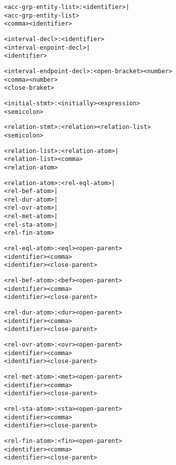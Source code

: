 \documentclass[11pt]{report}
\newenvironment{vverbatim}
{
  \begin{alltt}
}
{
    \vspace{-\baselineskip}
  \end{alltt}
}
\begin{document}
\begin{vverbatim}
<acc-grp-entity-list>    : <identifier> |
                           <acc-grp-entity-list>
                           <comma> <identifier>

<interval-decl>          : <identifier>
                           <interval-enpoint-decl> |
                           <identifier>

<interval-endpoint-decl> : <open-bracket> <number>
                           <comma> <number>
                           <close-braket>

<initial-stmt>           : <initially> <expression>
                           <semicolon>

<relation-stmt>          : <relation> <relation-list>
                           <semicolon>

<relation-list>          : <relation-atom> |
                           <relation-list> <comma>
                           <relation-atom>

<relation-atom>          : <rel-eql-atom> |
                           <rel-bef-atom> |
                           <rel-dur-atom> |
                           <rel-ovr-atom> |
                           <rel-met-atom> |
                           <rel-sta-atom> |
                           <rel-fin-atom>

<rel-eql-atom>           : <eql> <open-parent>
                           <identifier> <comma>
                           <identifier> <close-parent>

<rel-bef-atom>           : <bef> <open-parent>
                           <identifier> <comma>
                           <identifier> <close-parent>

<rel-dur-atom>           : <dur> <open-parent>
                           <identifier> <comma>
                           <identifier> <close-parent>

<rel-ovr-atom>           : <ovr> <open-parent>
                           <identifier> <comma>
                           <identifier> <close-parent>

<rel-met-atom>           : <met> <open-parent>
                           <identifier> <comma>
                           <identifier> <close-parent>

<rel-sta-atom>           : <sta> <open-parent>
                           <identifier> <comma>
                           <identifier> <close-parent>

<rel-fin-atom>           : <fin> <open-parent>
                           <identifier> <comma>
                           <identifier> <close-parent>


\end{vverbatim}
\end{document}
